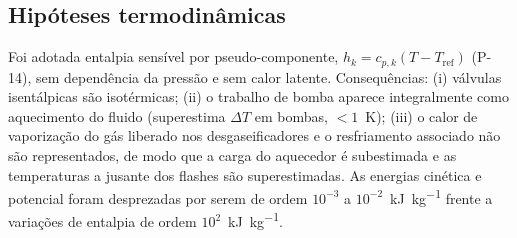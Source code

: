 \documentclass[11pt,a4paper]{article}
\numberwithin{equation}{section}
\numberwithin{table}{section}
\numberwithin{figure}{section}
\begin{document}
\subsection{Hipóteses termodinâmicas}
Foi adotada entalpia sensível por pseudo-componente, $h_k=c_{p,k}(T-T_{\mathrm{ref}})$ (P-14), sem dependência da pressão e sem calor latente. Consequências: (i) válvulas isentálpicas são isotérmicas; (ii) o trabalho de bomba aparece integralmente como aquecimento do fluido (superestima $\Delta T$ em bombas, $<1$~\si{\kelvin}); (iii) o calor de vaporização do gás liberado nos desgaseificadores e o resfriamento associado não são representados, de modo que a carga do aquecedor é subestimada e as temperaturas a jusante dos flashes são superestimadas. As energias cinética e potencial foram desprezadas por serem de ordem $10^{-3}$ a $10^{-2}$~\si{\kilo\joule\per\kilogram} frente a variações de entalpia de ordem $10^{2}$~\si{\kilo\joule\per\kilogram}.
\end{document}
